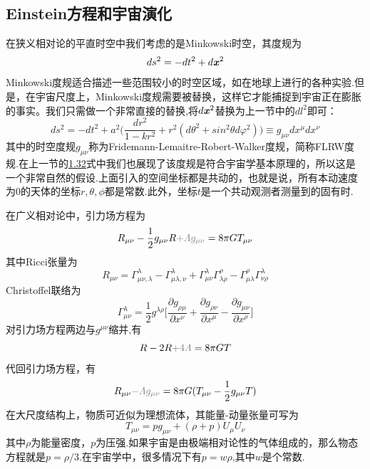 \documentclass[a4paper]{book}
\newcommand{\xtjc}[1]{\textbf{\textit{#1}}}
\begin{document}
\subsection{Einstein方程和宇宙演化}
在狭义相对论的平直时空中我们考虑的是Minkowski时空，其度规为
\begin{equation}
	ds^2=-dt^2+d\xtjc{x}^2
\end{equation}
Minkowski度规适合描述一些范围较小的时空区域，如在地球上进行的各种实验.但是，在宇宙尺度上，Minkowski度规需要被替换，这样它才能捕捉到宇宙正在膨胀的事实。我们只需做一个非常直接的替换,将$d\xtjc{x}^2$替换为上一节中的$dl^2$即可：
\begin{equation}
	ds^2=-dt^2+a^2\Big(\frac{dr^2}{1-kr^2}+r^2(d\theta^2+sin^2\theta d\varphi^2)\Big)\equiv g_{\mu\nu}dx^\mu dx^\nu
\end{equation}
其中的时空度规$g_{\mu\nu}$称为Fridemann-Lemaitre-Robert-Walker度规，简称FLRW度规.在上一节的\hyperref[1.32]{1.32}式中我们也展现了该度规是符合宇宙学基本原理的，所以这是一个非常自然的假设.上面引入的空间坐标都是共动的，也就是说，所有本动速度为0的天体的坐标$r,\theta ,\phi$都是常数.此外，坐标$t$是一个共动观测者测量到的固有时.\par 
在广义相对论中，引力场方程为
\begin{equation}
	R_{\mu \nu}-\frac{1}{2}g_{\mu \nu}R\textcolor{gray}{+\varLambda g_{\mu \nu}}=8\pi GT_{\mu \nu}
\end{equation}
其中Ricci张量为
\begin{equation}\label{1.50}
	R_{\mu\nu}=\Gamma^{\lambda}_{\mu\nu,\lambda}-\Gamma^{\lambda}_{\mu\lambda,\nu}+\Gamma^{\lambda}_{\mu\nu}\Gamma^{\rho}_{\lambda \rho}-\Gamma^{\rho}_{\mu\lambda}\Gamma^{\lambda}_{\nu \rho}
\end{equation}
Christoffel联络为
\begin{equation}\label{1.51}
	\Gamma^{\lambda}_{\mu \nu}=\frac{1}{2} g^{\lambda \rho}\Big[\frac{\partial g_{\rho \mu}}{\partial x^{\nu}}+\frac{\partial g_{\rho \nu}}{\partial x^{\mu}}-\frac{\partial g_{\mu \nu}}{\partial x^{\rho}}\Big]
\end{equation}
对引力场方程两边与$g^{\mu\nu}$缩并,有
\begin{equation}
	R-2R\textcolor{gray}{+4\varLambda}=8\pi GT
\end{equation}
代回引力场方程，有
\begin{equation}\label{1.53}
	R_{\mu\nu}\textcolor{gray}{-\varLambda g_{\mu\nu}}=8\pi G(T_{\mu\nu}-\frac{1}{2}g_{\mu\nu}T)
\end{equation}
在大尺度结构上，物质可近似为理想流体，其能量-动量张量可写为
\begin{equation}
	T_{\mu \nu }=pg_{\mu \nu }+(\rho +p)U_{\mu }U_{\nu}
\end{equation}
其中$\rho$为能量密度，$p$为压强.如果宇宙是由极端相对论性的气体组成的，那么物态方程就是$p=\rho/3$.在宇宙学中，很多情况下有$p=w\rho$,其中$w$是个常数.
\end{document}
